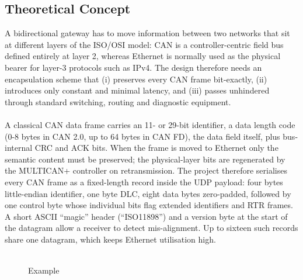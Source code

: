 \subsection{Theoretical Concept }
A bidirectional gateway has to move information between two networks that sit at different layers of the ISO/OSI model: CAN is a controller-centric field bus defined entirely at layer 2, whereas Ethernet is normally used as the physical bearer for layer-3 protocols such as IPv4. The design therefore needs an encapsulation scheme that (i) preserves every CAN frame bit-exactly, (ii) introduces only constant and minimal latency, and (iii) passes unhindered through standard switching, routing and diagnostic equipment.\\\\
A classical CAN data frame carries an 11- or 29-bit identifier, a data length code (0-8 bytes in CAN 2.0, up to 64 bytes in CAN FD), the data field itself, plus bus-internal CRC and ACK bits. When the frame is moved to Ethernet only the semantic content must be preserved; the physical-layer bits are regenerated by the MULTICAN+ controller on retransmission. The project therefore serialises every CAN frame as a fixed-length record inside the UDP payload: four bytes little-endian identifier, one byte DLC, eight data bytes zero-padded, followed by one control byte whose individual bits flag extended identifiers and RTR frames. A short ASCII “magic” header (“ISO11898”) and a version byte at the start of the datagram allow a receiver to detect mis-alignment. Up to sixteen such records share one datagram, which keeps Ethernet utilisation high.\\\\

\begin{figure}[h]
    \centering
     
    \caption{Example}
    \label{fig:ethernet}
\end{figure}

